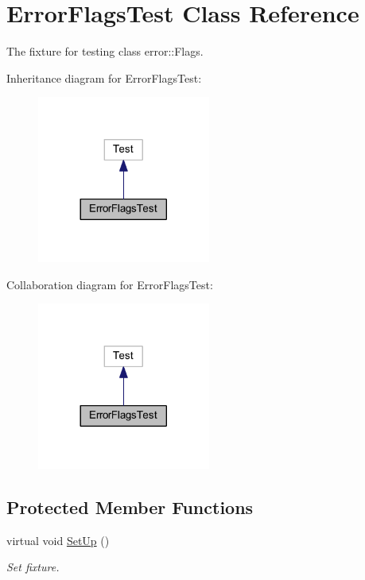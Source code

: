 \hypertarget{class_error_flags_test}{}\section{Error\+Flags\+Test Class Reference}
\label{class_error_flags_test}


The fixture for testing class error\+::\+Flags.  




Inheritance diagram for Error\+Flags\+Test\+:
\nopagebreak
\begin{figure}[H]
\begin{center}
\leavevmode
\includegraphics[width=161pt]{class_error_flags_test__inherit__graph}
\end{center}
\end{figure}


Collaboration diagram for Error\+Flags\+Test\+:
\nopagebreak
\begin{figure}[H]
\begin{center}
\leavevmode
\includegraphics[width=161pt]{class_error_flags_test__coll__graph}
\end{center}
\end{figure}
\subsection*{Protected Member Functions}
\begin{DoxyCompactItemize}
\item 
\hypertarget{class_error_flags_test_a14e4a93a156e1cb9e96b26d2a1dae27f}{}\label{class_error_flags_test_a14e4a93a156e1cb9e96b26d2a1dae27f} 
virtual void \hyperlink{class_error_flags_test_a14e4a93a156e1cb9e96b26d2a1dae27f}{Set\+Up} ()
\begin{DoxyCompactList}\small\item\em Set fixture. \end{DoxyCompactList}\end{DoxyCompactItemize}
